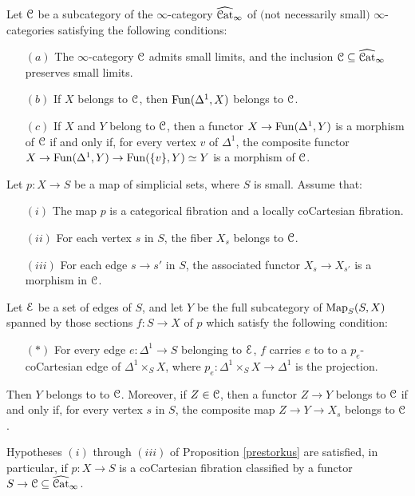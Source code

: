 \begin{proposition}\label{prestorkus}
Let $\operatorname{\mathcal{C}}$ be a subcategory of the $\infty$-category $\widehat{\operatorname{\mathcal{C}at}}_{\infty}$ of $($not necessarily small$)$ $\infty$-categories satisfying the following conditions:
\begin{itemize}
\item[$(a)$] The $\infty$-category $\operatorname{\mathcal{C}}$ admits small limits, and the inclusion
$\operatorname{\mathcal{C}} \subseteq \widehat{\operatorname{\mathcal{C}at}}_{\infty}$ preserves small limits.
\item[$(b)$] If $X$ belongs to $\operatorname{\mathcal{C}}$, then $\operatorname{Fun}(\Delta^1,X)$ belongs to $\operatorname{\mathcal{C}}$.
\item[$(c)$] If $X$ and $Y$ belong to $\operatorname{\mathcal{C}}$, then a functor $X \rightarrow \operatorname{Fun}(\Delta^1,Y)$ is a morphism of $\operatorname{\mathcal{C}}$ if and only if, for every vertex $v$ of $\Delta^1$, the composite functor
$X \rightarrow \operatorname{Fun}(\Delta^1,Y) \rightarrow \operatorname{Fun}( \{v\}, Y) \simeq Y$ is a morphism of $\operatorname{\mathcal{C}}$.
\end{itemize}

Let $p: X \rightarrow S$ be a map of simplicial sets, where $S$ is small.
Assume that:
\begin{itemize}
\item[$(i)$] The map $p$ is a categorical fibration and a locally coCartesian fibration.
\item[$(ii)$] For each vertex $s$ in $S$, the fiber $X_{s}$ belongs to $\operatorname{\mathcal{C}}$.
\item[$(iii)$] For each edge $s \rightarrow s'$ in $S$, the associated functor
$X_{s} \rightarrow X_{s'}$ is a morphism in $\operatorname{\mathcal{C}}$.
\end{itemize}
Let $\operatorname{\mathcal{E}}$ be a set of edges of $S$, and let $Y$ be the full subcategory of
$\operatorname{{Map}}_{S}(S, X)$ spanned by those sections $f: S \rightarrow X$ of $p$ which
satisfy the following condition:
\begin{itemize}
\item[$(\ast)$] For every edge $e: \Delta^1 \rightarrow S$ belonging to $\operatorname{\mathcal{E}}$,
$f$ carries $e$ to to a $p_{e}$-coCartesian edge of $\Delta^1 \times_{S} X$, where
$p_{e}: \Delta^1 \times_{S} X \rightarrow \Delta^1$ is the projection.
\end{itemize}
Then $Y$ belongs to to $\operatorname{\mathcal{C}}$. Moreover, if $Z \in \operatorname{\mathcal{C}}$, then a functor
$Z \rightarrow Y$ belongs to $\operatorname{\mathcal{C}}$ if and only if, for every vertex $s$ in $S$, the composite map
$Z \rightarrow Y \rightarrow X_{s}$
belongs to $\operatorname{\mathcal{C}}$.
\end{proposition}

\begin{remark}
Hypotheses $(i)$ through $(iii)$ of Proposition \ref{prestorkus} are satisfied, in particular, if $p: X \rightarrow S$ is a coCartesian fibration classified by a functor $S \rightarrow \operatorname{\mathcal{C}} \subseteq \widehat{\operatorname{\mathcal{C}at}}_{\infty}$.
\end{remark}

